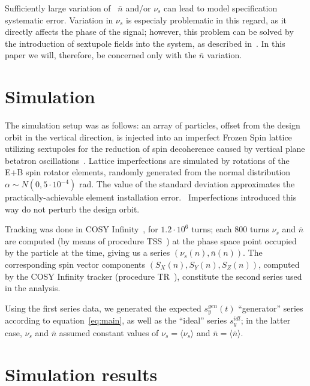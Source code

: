 \documentclass[a4paper]{jacow}
\newcommand{\avg}[1]{\langle {#1} \rangle}
\newcommand{\nbar}{\bar n}
\begin{document}
Sufficiently large variation of~ $\nbar$ and/or $\nu_s$ can lead to model specification systematic error.
Variation in $\nu_s$ is especialy problematic in this regard, as it directly affects the phase of the signal;
however, this problem can be solved by the introduction of sextupole fields into the system,
as described in~\cite{Aksentev:DecohIPAC19}. In this paper we will, therefore, be concerned only with the $\nbar$
variation.

\section{Simulation}
The simulation setup was as follows: an array of particles, offset from the design orbit in the vertical
direction, is injected into an imperfect Frozen Spin lattice~\cite{Senichev:Lattices} utilizing sextupoles for
the reduction of spin decoherence caused by vertical plane betatron oscillations~\cite{Aksentev:DecohIPAC19}.
Lattice imperfections are simulated by rotations of the E+B spin rotator elements, randomly generated from the
normal distribution $\alpha\sim N(0, 5\cdot 10^{-4})$ rad. The value of the standard deviation approximates
the practically-achievable element installation error.~\cite{Senichev:FDM} Imperfections introduced this way do
not perturb the design orbit.

Tracking was done in COSY Infinity~\cite{COSYINF:Website}, for $1.2\cdot10^6$ turns; each 800 turns
$\nu_s$ and $\nbar$ are computed (by means of procedure TSS~\cite[p.~41]{COSYINF:BeamPhysMan}) at
the phase space point occupied by the particle at the time, giving us a series $(\nu_s(n), \nbar(n))$.
The corresponding spin vector components $(S_X(n), S_Y(n), S_Z(n))$, computed by the COSY Infinity tracker
(procedure TR~\cite[p.~41]{COSYINF:BeamPhysMan}), constitute the second series used in the analysis.

Using the first series data, we generated the expected $s_y^{gen}(t)$ ``generator'' series according to
equation~\eqref{eq:main}, as well as the ``ideal'' series $s_y^{idl}$; in the latter case, $\nu_s$ and $\nbar$
assumed constant values of $\nu_s = \avg{\nu_s}$ and $\nbar = \avg{\nbar}$. 

\section{Simulation results}
\end{document}
